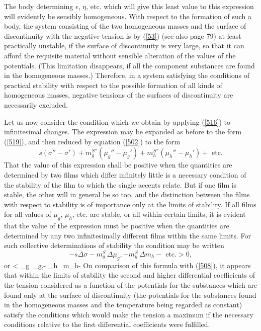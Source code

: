 \documentclass[12pt]{article}
\begin{document}
{The body determining $\epsilon$, $\eta$, etc. which will give this least value to this expression will evidently be sensibly homogeneous. With respect to the formation of such a body, the system consisting of the two homogeneous masses and the surface of discontinuity with the negative tension is by (\ref{53}) (see also page 79) at least practically unstable, if the surface of discontinuity is very large, so that it can afford the requisite material without sensible alteration of the values of the potentials. (This limitation disappears, if all the component substances are found in the homogeneous masses.) Therefore, in a system satisfying the conditions of practical stability with respect to the possible formation of all kinds of homogeneous masses, negative tensions of the surfaces of discontinuity are necessarily excluded.

Let us now consider the condition which we obtain by applying (\ref{516}) to infinitesimal changes. The expression may be expanded as before to the form (\ref{519}), and then reduced by equation (\ref{502}) to the form         
$$ s(\sigma'' -\sigma') + m_g^{S''}(\mu_g''-\mu_g') + m_h^{S''}(\mu_h'' -\mu_h')+ \text{ etc.} $$
That the value of this expression shall be positive when the quantities are determined by two films which differ infinitely little is a necessary condition of the stability of the film to which the single accents relate. But if one film is stable, the other will in general be so too, and the distinction between the films with respect to stability is of importance only at the limits of stability. If all films for all values of $\mu_g$, $\mu_h$, etc. are stable, or all within certain limits, it is evident that the value of the expression must be positive when the quantities are determined by any two infinitesimally different films within the same limits. For such collective determinations of stability the condition may be written
$$ -s\Delta \sigma- m_g^S\, \Delta\mu_g,- m_h^S \, \Delta m_h - \text{ etc.} > 0,$$
or
\eqs \Delta \sigma< \Gamma_g\, \Delta\mu_g,- \Gamma_h \, \Delta m_h-  \label{521} \eqe
On comparison of this formula with (\ref{508}), it appears that within the limits of stability the second and higher differential coefficients of the tension considered as a function of the potentials for the substances which are found only at the surface of discontinuity (the potentials for the substances found in the homogeneous masses and the temperature being regarded as constant) satisfy the conditions which would make the tension a maximum if the necessary conditions relative to the first differential coefficients were fulfilled.

}
\end{document}
